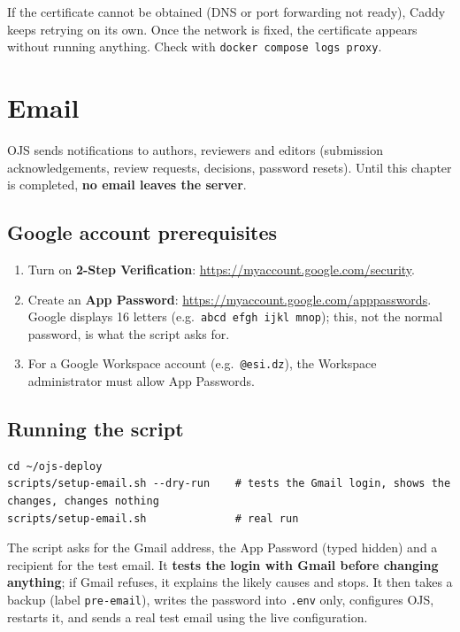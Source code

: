 \documentclass[11pt,a4paper]{report}
\newcommand{\code}[1]{\texttt{\small #1}}
\newcommand{\file}[1]{\texttt{\small #1}}
\begin{document}
\begin{note}
If the certificate cannot be obtained (DNS or port forwarding not ready), Caddy keeps retrying
on its own. Once the network is fixed, the certificate appears without running anything. Check
with \code{docker compose logs proxy}.
\end{note}

\chapter{Email}\label{ch:email}

OJS sends notifications to authors, reviewers and editors (submission acknowledgements, review
requests, decisions, password resets). Until this chapter is completed, \textbf{no email leaves
the server}.

\section{Google account prerequisites}
\begin{enumerate}
  \item Turn on \textbf{2-Step Verification}: \url{https://myaccount.google.com/security}.
  \item Create an \textbf{App Password}: \url{https://myaccount.google.com/apppasswords}.
        Google displays 16 letters (e.g.\ \code{abcd efgh ijkl mnop}); this, not the normal password,
        is what the script asks for.
  \item For a Google Workspace account (e.g.\ \code{@esi.dz}), the Workspace administrator must allow
        App Passwords.
\end{enumerate}

\section{Running the script}
\begin{lstlisting}
cd ~/ojs-deploy
scripts/setup-email.sh --dry-run    # tests the Gmail login, shows the changes, changes nothing
scripts/setup-email.sh              # real run
\end{lstlisting}
The script asks for the Gmail address, the App Password (typed hidden) and a recipient for the
test email. It \textbf{tests the login with Gmail before changing anything}; if Gmail refuses, it
explains the likely causes and stops. It then takes a backup (label \code{pre-email}), writes the
password into \file{.env} only, configures OJS, restarts it, and sends a real test email using
the live configuration.
\end{document}
